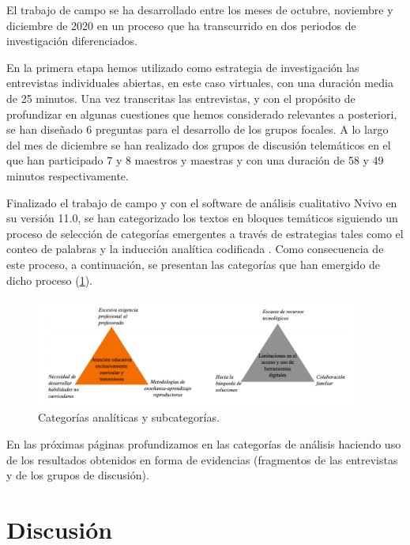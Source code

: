 \documentclass[spanish]{textolivre}
\begin{document}
El trabajo de campo se ha desarrollado entre los meses de octubre, noviembre y diciembre de 2020 en un proceso que ha transcurrido en dos periodos de investigación diferenciados.

En la primera etapa hemos utilizado como estrategia de investigación las entrevistas individuales abiertas, en este caso virtuales, con una duración media de 25 minutos. Una vez transcritas las entrevistas, y con el propósito de profundizar en algunas cuestiones que hemos considerado relevantes a posteriori, se han diseñado 6 preguntas para el desarrollo de los grupos focales. A lo largo del mes de diciembre se han realizado dos grupos de discusión telemáticos en el que han participado 7 y 8 maestros y maestras y con una duración de 58 y 49 minutos respectivamente.

Finalizado el trabajo de campo y con el software de análisis cualitativo Nvivo en su versión 11.0, se han categorizado los textos en bloques temáticos siguiendo un proceso de selección de categorías emergentes a través de estrategias tales como el conteo de palabras y la inducción analítica codificada \cite{ryan2003}. %
Como consecuencia de este proceso, a continuación, se presentan las categorías que han emergido de dicho proceso (\cref{fig1}).

\begin{figure}[htbp]
 \centering
 \includegraphics[width=0.95\textwidth]{figura.png}
 \caption{Categorías analíticas y subcategorías.}
 \label{fig1}
\end{figure}

En las próximas páginas profundizamos en las categorías de análisis haciendo uso de los resultados obtenidos en forma de evidencias (fragmentos de las entrevistas y de los grupos de discusión).

\section{Discusión}
\end{document}
